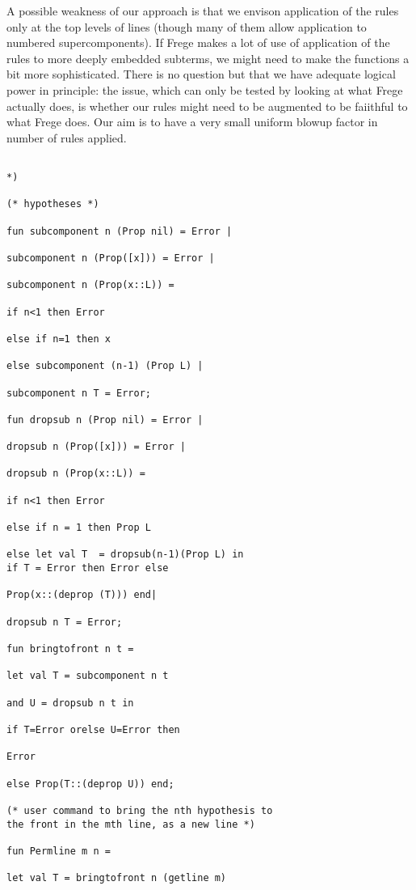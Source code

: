 \documentclass{article}
\begin{document}
{{A possible weakness of our approach is that we envison application of the rules only at the top levels of lines (though many of them allow application to numbered supercomponents).
If Frege makes a lot of use of application of the rules to more deeply embedded subterms, we might need to make the functions a bit more sophisticated.  There is no question but that we have adequate logical power in principle:  the issue, which can only be tested by looking at what Frege actually does, is whether our rules might need to be augmented to be faiithful to what Frege does.  Our aim is to have a very small uniform blowup factor in number of rules applied.


\begin{verbatim}

*)

(* hypotheses *)

fun subcomponent n (Prop nil) = Error |

subcomponent n (Prop([x])) = Error |

subcomponent n (Prop(x::L)) =

if n<1 then Error

else if n=1 then x

else subcomponent (n-1) (Prop L) |

subcomponent n T = Error;

fun dropsub n (Prop nil) = Error |

dropsub n (Prop([x])) = Error |

dropsub n (Prop(x::L)) =

if n<1 then Error

else if n = 1 then Prop L

else let val T  = dropsub(n-1)(Prop L) in
if T = Error then Error else

Prop(x::(deprop (T))) end|

dropsub n T = Error;

fun bringtofront n t =

let val T = subcomponent n t

and U = dropsub n t in

if T=Error orelse U=Error then

Error

else Prop(T::(deprop U)) end;

(* user command to bring the nth hypothesis to
the front in the mth line, as a new line *)

fun Permline m n =

let val T = bringtofront n (getline m)


\end{verbatim}}}
\end{document}
